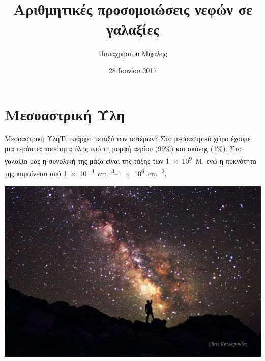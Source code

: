\documentclass{beamer}
\title{Αριθμητικές προσομοιώσεις νεφών σε γαλαξίες}
\author{Παπαχρήστου Μιχάλης}
\date{28 Ιουνίου 2017}
\begin{document}
\begin{frame}
  \titlepage
\end{frame}


\section{Μεσοαστρική Ύλη}


\begin{frame}{Μεσοαστρική Ύλη}{Τι υπάρχει μεταξύ των αστέρων?}
	Στο μεσοαστρικό χώρο έχουμε μια τεράστια ποσότητα ύλης υπό τη μορφή αερίου (99\%) και σκόνης (1\%). Στο γαλαξία μας η συνολική της μάζα είναι της τάξης των \SI{1e9}{ M_{\odot}}, ενώ η πυκνότητα της κυμαίνεται από \SIrange{1e-4}{1e6}{cm^{-3}}.
\begin{center}
	\includegraphics[width=0.8\linewidth]{Images/NightSkyPhotography04}
\end{center}
\end{frame}
\end{document}
